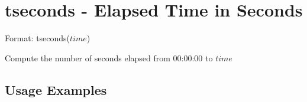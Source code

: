 %

\section{tseconds - Elapsed Time in Seconds\label{sect:tseconds}}

Format: tseconds($time$)

Compute the number of seconds elapsed from 00:00:00 to $time$

\subsection*{Usage Examples}


%

